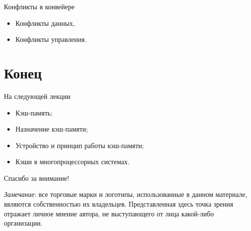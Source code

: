 \begin{frame}{Конфликты в конвейере}
\begin{itemize}
    \item Конфликты данных,
    \item Конфликты управления.
\end{itemize}
\end{frame}

\section*{Конец}

\begin{frame}{На следующей лекции}
\begin{itemize}
\ifsbertech
    \item Кэш-память;
    \item Назначение кэш-памяти;
    \item Устройство и принцип работы кэш-памяти;
    \item Кэши в многопроцессорных системах.
\fi
\end{itemize}
\end{frame}

\begin{frame}

{\huge{Спасибо за внимание!}\par}

\vfill

\tiny{\textit{Замечание}: все торговые марки и логотипы, использованные в данном материале, являются собственностью их владельцев. Представленная здесь точка зрения отражает личное мнение автора, не выступающего от лица какой-либо организации.}

\end{frame}


